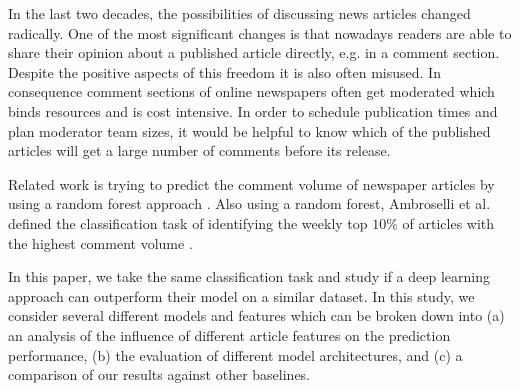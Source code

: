 In the last two decades, the possibilities of discussing news articles changed radically.
One of the most significant changes is that nowadays readers are able to share their opinion about a published article directly, e.g. in a comment section.
Despite the positive aspects of this freedom it is also often misused.
In consequence comment sections of online newspapers often get moderated which binds resources and is cost intensive.
In order to schedule publication times and plan moderator team sizes, it would be helpful to know which of the published articles will get a large number of comments before its release.

Related work is trying to predict the comment volume of newspaper articles by using a random forest approach \cite{tsagkias2009predicting}.
Also using a random forest, Ambroselli et al. defined the classification task of identifying the weekly top $10\%$ of articles with the highest comment volume \cite{ambroselli2018prediction}.

In this paper, we take the same classification task and study if a deep learning approach can outperform their model on a similar dataset.
In this study, we consider several different models and features which can be broken down into (a) an analysis of the influence of different article features on the prediction performance, (b) the evaluation of different model architectures, and (c) a comparison of our results against other baselines.
